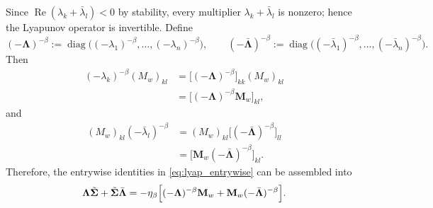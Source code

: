 \documentclass[12pt]{article}
\begin{document}
Since $\operatorname{Re}(\lambda_k+\bar\lambda_l)<0$ by stability, every multiplier
$\lambda_k+\bar\lambda_l$ is nonzero; hence the Lyapunov operator is invertible.
Define
\begin{equation*}
    (-\boldsymbol\Lambda)^{-\beta}
    :=\operatorname{diag}\bigl((-\lambda_1)^{-\beta},\dots,(-\lambda_n)^{-\beta}\bigr),
    \qquad
    (-\bar{\boldsymbol\Lambda})^{-\beta}
    :=\operatorname{diag}\bigl((-\bar\lambda_1)^{-\beta},\dots,(-\bar\lambda_n)^{-\beta}\bigr).
\end{equation*}
Then
\begin{equation}
\begin{aligned}
    (-\lambda_k)^{-\beta}(M_w)_{kl}
    &=\bigl[(-\boldsymbol\Lambda)^{-\beta}\bigr]_{kk}(M_w)_{kl}\\
    &=\bigl[(-\boldsymbol\Lambda)^{-\beta}\mathbf M_w\bigr]_{kl},
\end{aligned}
    \label{eq:left_power_entry}
\end{equation}
and
\begin{equation}
\begin{aligned}
    (M_w)_{kl}(-\bar\lambda_l)^{-\beta}
    &=(M_w)_{kl}\bigl[(-\bar{\boldsymbol\Lambda})^{-\beta}\bigr]_{ll}\\
    &=\bigl[\mathbf M_w(-\bar{\boldsymbol\Lambda})^{-\beta}\bigr]_{kl}.
\end{aligned}
    \label{eq:right_power_entry}
\end{equation}
Therefore, the entrywise identities in \eqref{eq:lyap_entrywise} can be assembled into
\begin{equation}
    \boldsymbol\Lambda\tilde{\boldsymbol\Sigma}+\tilde{\boldsymbol\Sigma}\bar{\boldsymbol\Lambda}
    =-\eta_\beta\Bigl[(-\boldsymbol\Lambda)^{-\beta}\mathbf M_w
    +\mathbf M_w(-\bar{\boldsymbol\Lambda})^{-\beta}\Bigr].
    \label{eq:lyap_eigen_coordinates}
\end{equation}
\end{document}
